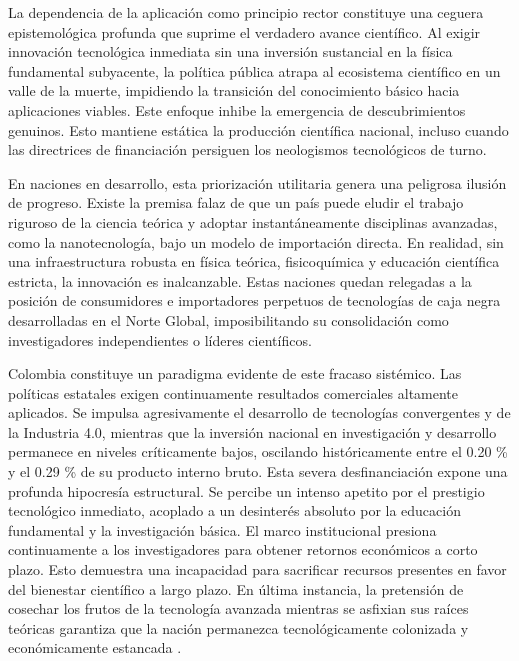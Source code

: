 La dependencia de la aplicación como principio rector constituye una ceguera
epistemológica profunda que suprime el verdadero avance científico. Al exigir
innovación tecnológica inmediata sin una inversión sustancial en la física
fundamental subyacente, la política pública atrapa al ecosistema científico en
un valle de la muerte, impidiendo la transición del conocimiento básico hacia
aplicaciones viables. Este enfoque inhibe la emergencia de
descubrimientos genuinos. Esto mantiene estática la producción científica
nacional, incluso cuando las directrices de financiación persiguen los
neologismos tecnológicos de turno.

En naciones en desarrollo, esta priorización utilitaria genera una peligrosa
ilusión de progreso. Existe la premisa falaz de que un país puede eludir el
trabajo riguroso de la ciencia teórica y adoptar instantáneamente disciplinas
avanzadas, como la nanotecnología, bajo un modelo de importación directa. En
realidad, sin una infraestructura robusta en física teórica, fisicoquímica y
educación científica estricta, la innovación es inalcanzable. Estas naciones
quedan relegadas a la posición de consumidores e importadores perpetuos de
tecnologías de caja negra desarrolladas en el Norte Global, imposibilitando su
consolidación como investigadores independientes o líderes científicos.

Colombia constituye un paradigma evidente de este fracaso sistémico. Las
políticas estatales exigen continuamente resultados comerciales altamente
aplicados. Se impulsa agresivamente el desarrollo de tecnologías convergentes y
de la Industria 4.0, mientras que la inversión nacional en investigación y
desarrollo permanece en niveles críticamente bajos, oscilando históricamente
entre el 0.20 \% y el 0.29 \% de su producto interno bruto. Esta
severa desfinanciación expone una profunda hipocresía estructural. Se percibe
un intenso apetito por el prestigio tecnológico inmediato, acoplado a un
desinterés absoluto por la educación fundamental y la investigación básica. El
marco institucional presiona continuamente a los investigadores para obtener
retornos económicos a corto plazo. Esto demuestra una incapacidad para
sacrificar recursos presentes en favor del bienestar científico a largo plazo.
En última instancia, la pretensión de cosechar los frutos de la
tecnología avanzada mientras se asfixian sus raíces teóricas garantiza que la
nación permanezca tecnológicamente colonizada y económicamente estancada
\cite{cortesShiftingPoliciesStatic2025,
foreropinedaColombiaPathKnowledgebased2020}.
